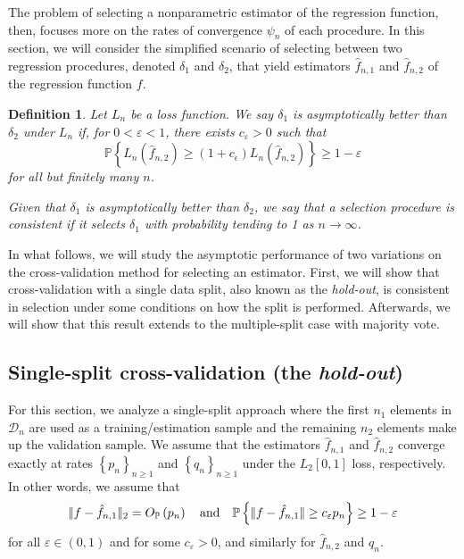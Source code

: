 \documentclass[11pt, letter paper]{article}
\newcommand{\1}{\mathmybb{1}}
\newtheorem{definition}{Definition}[section]
\newcommand{\0}{\emptyset}
\newcommand{\prob}{\mathbb{P}}
\newcommand{\paren}[1]{\left(#1 \right)}
\newcommand{\set}[1]{\left\{ #1 \right\}}
\newcommand{\norm}[1]{|\hspace{-1pt}|#1 |\hspace{-1pt}|}
\newcommand{\data}{\mathcal{D}_{n}}
\newcommand{\Loss}[1]{L_{n}\paren{#1}}
\newcommand{\Op}[1]{O_{\prob}\paren{#1}}
\newcommand{\fhat}[2]{\hat{f}_{#1, #2}}
\begin{document}
The problem of selecting a nonparametric estimator of the regression function, then, focuses more on the rates of convergence \(\psi_{n}\) of each procedure. In this section, we will consider the simplified scenario of selecting between 
two regression procedures, denoted \(\delta_{1}\) and \(\delta_{2}\), that yield estimators \(\hat{f}_{n, 1}\) and \(\hat{f}_{n, 2}\) of the regression function \(f\).

\begin{definition}
    Let \(L_{n}\) be a loss function. We say \(\delta_{1}\) is \emph{asymptotically better} than \(\delta_{2}\) under \(L_{n}\) if, for \(0<\varepsilon<1\), there exists \(c_{\varepsilon}>0\) such that
    \[\prob\set{\Loss{\fhat{n}{2}}\geq (1+c_{\epsilon})\Loss{\fhat{n}{2}} }\geq 1-\varepsilon\]
    for all but finitely many \(n\).

    Given that \(\delta_{1}\) is asymptotically better than \(\delta_{2}\), we say that a selection procedure is consistent if it selects \(\delta_{1}\) with probability tending to 1 as \(n\to\infty\).
\end{definition}

In what follows, we will study the asymptotic performance of two variations on the cross-validation method for selecting an estimator. First, we will show that cross-validation with a single data split, also known as the \emph{hold-out}, is consistent in selection under some conditions on how the split is performed. Afterwards, we will show that this result extends to the multiple-split case with majority vote.

\subsection{Single-split cross-validation (the \emph{hold-out})}

For this section, we analyze a single-split approach where the first \(n_1\) elements in \(\data\) are used as a training/estimation sample and the remaining \(n_2\) elements make up the validation sample. We assume that the estimators \(\fhat{n}{1}\) and \(\fhat{n}{2}\) converge exactly at rates \(\set{p_{n}}_{n\geq 1}\) and \(\set{q_{n}}_{n\geq 1}\) under the \(L_{2}[0,1]\) loss, respectively. In other words, we assume that
\[\norm{f - \fhat{n}{1}}_{2} = \Op{p_{n}} \quad\text{and}\quad \prob\set{\norm{f-\fhat{n}{1}} \geq c_{\varepsilon}p_{n}} \geq 1-\varepsilon\]
for all \(\varepsilon\in(0,1)\) and for some \(c_{\varepsilon}>0\), and similarly for \(\fhat{n}{2}\) and \(q_{n}\).
\end{document}
